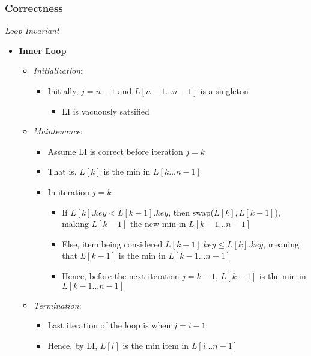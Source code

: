 \documentclass[10pt, 
a4paper, 
oneside, 
headinclude, footinclude, 
BCOR5mm]
{scrartcl}
\begin{document}
\subsubsection{Correctness}
\begin{definition}
    \textit{Loop Invariant}
    \begin{itemize}
        \item \textbf{Inner Loop}
        \begin{itemize}
            \item \textit{Initialization}:
            \begin{itemize}
                \item Initially, $j=n-1$ and $L[n-1...n-1]$ is a singleton
                \begin{itemize}
                    \item LI is vacuously satsified
                \end{itemize}
            \end{itemize}
            \item \textit{Maintenance}:
            \begin{itemize}
                \item Assume LI is correct before iteration $j=k$
                \item That is, $L[k]$ is the min in $L[k...n-1]$
                \item In iteration $j=k$
                \begin{itemize}
                    \item If $L[k].key<L[k-1].key$, then swap($L[k],L[k-1]$), making $L[k-1]$ the new min in $L[k-1...n-1]$
                    \item Else, item being considered $L[k-1].key \leq L[k].key$, meaning that $L[k-1]$ is the min in $L[k-1...n-1]$
                    \item Hence, before the next iteration $j=k-1$, $L[k-1]$ is the min in $L[k-1...n-1]$
                \end{itemize}
            \end{itemize}
            \item \textit{Termination}:
            \begin{itemize}
                \item Last iteration of the loop is when $j=i-1$
                \item Hence, by LI, $L[i]$ is the min item in $L[i...n-1]$
            \end{itemize}

\end{itemize}
\end{itemize}
\end{definition}
\end{document}
